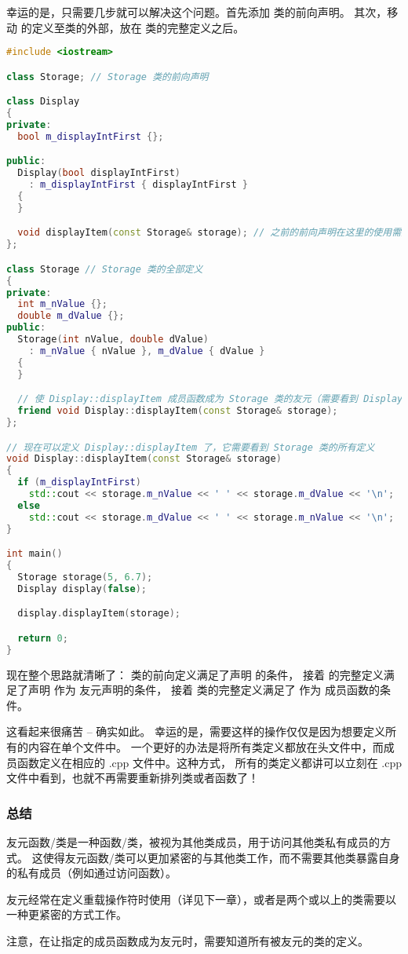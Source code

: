 \documentclass[../../LearnCpp.tex]{subfiles}
\begin{document}
幸运的是，只需要几步就可以解决这个问题。首先添加  类的前向声明。
其次，移动  的定义至类的外部，放在  类的完整定义之后。

\begin{lstlisting}[language=C++]
#include <iostream>

class Storage; // Storage 类的前向声明

class Display
{
private:
  bool m_displayIntFirst {};

public:
  Display(bool displayIntFirst)
    : m_displayIntFirst { displayIntFirst }
  {
  }

  void displayItem(const Storage& storage); // 之前的前向声明在这里的使用需要
};

class Storage // Storage 类的全部定义
{
private:
  int m_nValue {};
  double m_dValue {};
public:
  Storage(int nValue, double dValue)
    : m_nValue { nValue }, m_dValue { dValue }
  {
  }

  // 使 Display::displayItem 成员函数成为 Storage 类的友元（需要看到 Display 类的所有定义）
  friend void Display::displayItem(const Storage& storage);
};

// 现在可以定义 Display::displayItem 了，它需要看到 Storage 类的所有定义
void Display::displayItem(const Storage& storage)
{
  if (m_displayIntFirst)
    std::cout << storage.m_nValue << ' ' << storage.m_dValue << '\n';
  else
    std::cout << storage.m_dValue << ' ' << storage.m_nValue << '\n';
}

int main()
{
  Storage storage(5, 6.7);
  Display display(false);

  display.displayItem(storage);

  return 0;
}
\end{lstlisting}

现在整个思路就清晰了： 类的前向定义满足了声明  的条件，
接着  的完整定义满足了声明  作为  友元声明的条件，
接着  类的完整定义满足了  作为  成员函数的条件。

这看起来很痛苦 -- 确实如此。
幸运的是，需要这样的操作仅仅是因为想要定义所有的内容在单个文件中。
一个更好的办法是将所有类定义都放在头文件中，而成员函数定义在相应的 .cpp 文件中。这种方式，
所有的类定义都讲可以立刻在 .cpp 文件中看到，也就不再需要重新排列类或者函数了！

\subsubsection*{总结}

友元函数/类是一种函数/类，被视为其他类成员，用于访问其他类私有成员的方式。
这使得友元函数/类可以更加紧密的与其他类工作，而不需要其他类暴露自身的私有成员（例如通过访问函数）。

友元经常在定义重载操作符时使用（详见下一章），或者是两个或以上的类需要以一种更紧密的方式工作。

注意，在让指定的成员函数成为友元时，需要知道所有被友元的类的定义。
\end{document}
